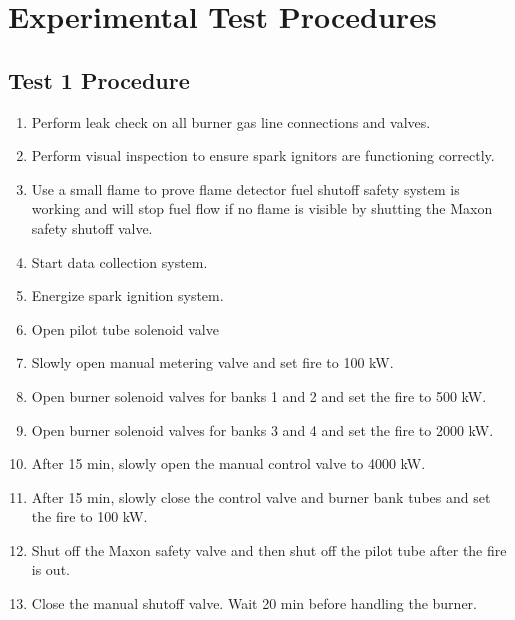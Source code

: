 \documentclass[12pt,oneside]{book}
\begin{document}
\chapter{Experimental Test Procedures}
\label{test_procedure}
\section{Test 1 Procedure}
\label{procedure1}

\begin{enumerate}
  \item Perform leak check on all burner gas line connections and valves.
  \item Perform visual inspection to ensure spark ignitors are functioning correctly.
  \item Use a small flame to prove flame detector fuel shutoff safety system is working and will stop fuel flow if no flame is visible by shutting the Maxon safety shutoff valve.
  \item Start data collection system.
  \item Energize spark ignition system.
  \item Open pilot tube solenoid valve
  \item Slowly open manual metering valve and set fire to 100 kW.
  \item Open burner solenoid valves for banks 1 and 2 and set the fire to 500 kW.
  \item Open burner solenoid valves for banks 3 and 4 and set the fire to 2000 kW.
  \item After 15 min, slowly open the manual control valve to 4000 kW.
  \item After 15 min, slowly close the control valve and burner bank tubes and set the fire to 100 kW.
  \item Shut off the Maxon safety valve and then shut off the pilot tube after the fire is out.
  \item Close the manual shutoff valve. Wait 20 min before handling the burner.
\end{enumerate}
\end{document}
